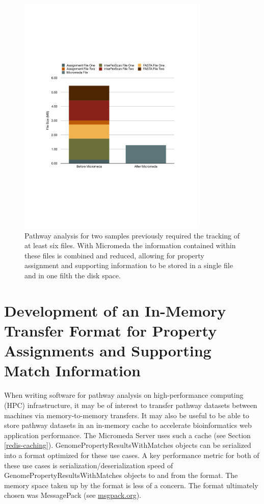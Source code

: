 \begin{figure}[!ht]
  \centering
	\includegraphics[width=0.80\textwidth]{media/micromeda_file_size.pdf}
	 \caption{Pathway analysis for two samples previously required the tracking of at least six files. With Micromeda the information contained within these files is combined and reduced, allowing for property assignment and supporting information to be stored in a single file and in one filth the disk space.}
	 \label{fig:micromedafilesize}
\end{figure}

\section{Development of an In-Memory Transfer Format for Property Assignments and Supporting Match Information} \label{msgpack}

When writing software for pathway analysis on high-performance computing (HPC) infrastructure, it may be of interest to transfer pathway datasets between machines via memory-to-memory transfers. It may also be useful to be able to store pathway datasets in an in-memory cache to accelerate bioinformatics web application performance. The Micromeda Server uses such a cache (see Section \ref{redis-caching}). GenomePropertyResultsWithMatches objects can be serialized into a format optimized for these use cases. A key performance metric for both of these use cases is serialization/deserialization speed of GenomePropertyResultsWithMatches objects to and from the format. The memory space taken up by the format is less of a concern. The format ultimately chosen was MessagePack  \cite{furuhashi2013messagepack}(see \href{msgpack.org}{msgpack.org}).

